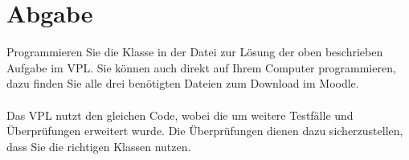 \documentclass{article}
\begin{document}
	\section{Abgabe}
		Programmieren Sie die Klasse \grqq{} in der Datei \grqq{} zur Lösung der oben beschrieben Aufgabe im VPL.
		Sie können auch direkt auf Ihrem Computer programmieren, dazu finden Sie alle drei benötigten Dateien zum Download im Moodle.\\
		\\
		Das VPL nutzt den gleichen Code, wobei die \grqq{} um weitere Testfälle und Überprüfungen erweitert wurde.
		Die Überprüfungen dienen dazu sicherzustellen, dass Sie die richtigen Klassen nutzen.\\
\end{document}
